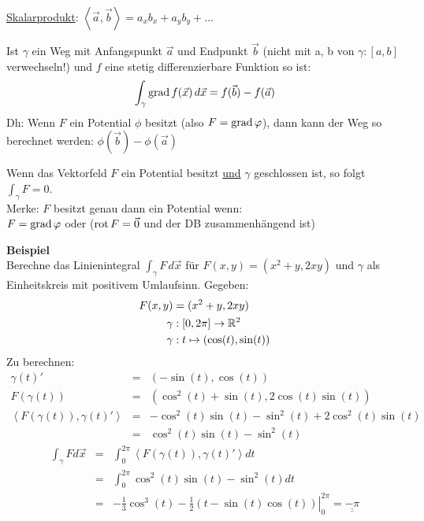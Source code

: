 \underline{Skalarprodukt}: $\left< \vec{a}, \vec{b} \right> = a_x b_x + a_y b_y + \ldots$

\begin{satz}
Ist $\gamma$ ein Weg mit Anfangspunkt $\vec{a}$ und Endpunkt $\vec{b}$ (nicht mit a, b von $\gamma: [a, b]$ verwechseln!) und $f$ eine stetig differenzierbare Funktion so ist:
\[
	\int_{\gamma} \operatorname{grad} f(\vec{x}) \, d\vec{x} = f(\vec{b}) - f(\vec{a})
\]
Dh: Wenn $F$ ein Potential $\phi$ besitzt (also $F = \operatorname{grad} \varphi$), dann kann der Weg so berechnet werden: $\phi(\vec{b}) - \phi(\vec{a})$
\end{satz}

\begin{lemma}
Wenn das Vektorfeld $F$ ein Potential besitzt \uline{und} $\gamma$ geschlossen ist, so folgt $\int_\gamma F = 0$.\\
Merke: $F$ besitzt genau dann ein Potential wenn:\\
$F = \operatorname{grad} \varphi$ oder ($\operatorname{rot} F = \vec{0}$ und der DB zusammenhängend ist)
\end{lemma}

\textbf{Beispiel}\\
Berechne das Linienintegral $\int_\gamma F \, d\vec{x} $ für $ F(x,y) = (x^2+y, 2xy)$ und $\gamma$ als Einheitskreis mit positivem Umlaufsinn.
Gegeben:
\begin{align*}
F(x,y) &= (x^2+y, 2xy) \\
\gamma &: [0,2\pi]  \to \mathbb{R}^2\\
\gamma &: t \mapsto   (\cos(t), \sin(t)) 
\end{align*}
Zu berechnen:
\begin{eqnarray*}
\gamma(t)' &=& (-\sin(t),\cos(t))\\
F(\gamma(t)) &=& (\cos^2(t) + \sin(t), 2 \cos(t)\sin(t))\\
\left< F(\gamma(t)), \gamma(t)' \right> &=& -\cos^2(t)\sin(t) - \sin^2(t) + 2\cos^2(t)\sin(t)\\
 &=& \cos^2(t)\sin(t) - \sin^2(t)
\end{eqnarray*}
\begin{eqnarray*}
\int_\gamma F d\vec{x} &=& \int_0^{2\pi} \left< F(\gamma(t)), \gamma(t)' \right> dt\\
&=& \int_0^{2\pi} \cos^2(t)\sin(t) - \sin^2(t) dt\\
&=& \left. -\frac{1}{3}\cos^3(t) - \frac{1}{2}(t - \sin(t)\cos(t))
\right|_0^{2\pi} = \underline{\underline{-\pi}}
\end{eqnarray*}

